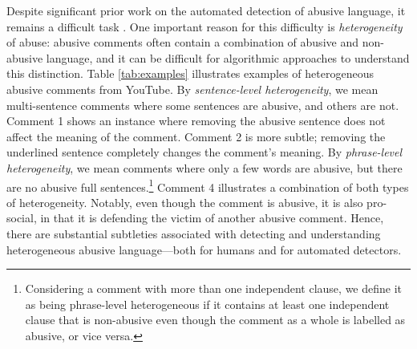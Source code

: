 \documentclass[letterpaper]{article} %
\begin{document}
Despite significant prior work on the automated detection of abusive language, it remains a difficult task \cite{vidgen2019challenges}.
One important reason for this difficulty is \textit{heterogeneity} of abuse:
abusive comments often contain a combination of abusive and non-abusive language, and it can be difficult for algorithmic approaches to understand this distinction.
Table \ref{tab:examples} illustrates examples of heterogeneous abusive comments from YouTube.
By \emph{sentence-level heterogeneity}, we mean multi-sentence comments where some sentences are abusive, and others are not.
Comment 1 shows an instance where removing the abusive sentence does not affect the meaning of the comment.
Comment 2 is more subtle; removing the underlined sentence completely changes the comment's meaning.
By \emph{phrase-level heterogeneity}, we mean comments where only a few words are abusive, but there are no abusive full sentences.\footnote{Considering a comment with more than one independent clause, we define it  as being phrase-level heterogeneous if it contains at least one independent clause that is non-abusive even though the comment as a whole is labelled as abusive, or vice versa.}
Comment 4 illustrates a combination of both types of heterogeneity.
Notably, even though the comment is abusive, it is also pro-social, in that it is defending the victim of another abusive comment.
Hence, there are substantial subtleties associated with detecting and understanding heterogeneous abusive language---both for humans and for automated detectors.
\end{document}
